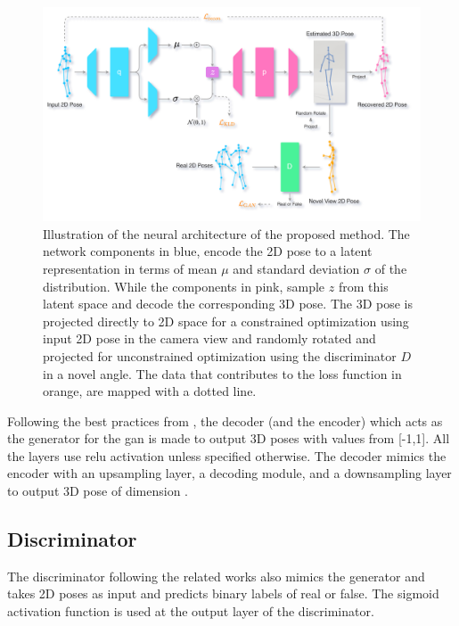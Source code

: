 \begin{figure}[h]
    \centering
    \includegraphics[width=\textwidth]{figures/arch/method_arch.png}
    \caption{Illustration of the neural architecture of the proposed method. The network components in blue, encode the 2D pose to a latent representation in terms of mean $\mu$ and standard deviation $\sigma$ of the distribution. While the components in pink, sample $z$ from this latent space and decode the corresponding 3D pose. The 3D pose is projected directly to 2D space for a constrained optimization using input 2D pose in the camera view and randomly rotated and projected for unconstrained optimization using the discriminator $D$ in a novel angle. The data that contributes to the loss function in orange, are mapped with a dotted line.  
    }
    \label{fig:method_arch}
\end{figure}




Following the best practices from \cite{soumith2017wasserstein}, the decoder (and the encoder) which acts as the generator for the \ac{gan} is made to output 3D poses with values from [-1,1]. 
All the layers use \ac{relu} activation unless specified otherwise. The decoder mimics the encoder with an upsampling layer, a decoding module, and a downsampling layer to output 3D pose of dimension .


\subsection{Discriminator}%
The discriminator following the related works also mimics the generator and takes 2D poses as input and predicts binary labels of real or false. The sigmoid activation function is used at the output layer of the discriminator.

